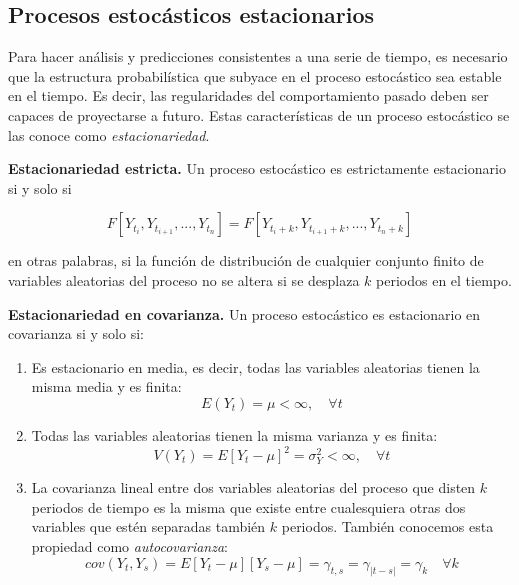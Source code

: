 \documentclass[a4paper,10pt]{article}
\begin{document}
\subsection{Procesos estocásticos estacionarios}

Para hacer análisis y predicciones consistentes a una serie de tiempo, es necesario que la estructura probabilística que subyace en el proceso estocástico sea estable en el tiempo. Es decir, las regularidades del comportamiento pasado deben ser capaces de proyectarse a futuro. Estas características de un proceso estocástico se las conoce como \textit{estacionariedad}.

\textbf{Estacionariedad estricta.} Un proceso estocástico es estrictamente estacionario si y solo si

\begin{equation}
F[Y_{t_i}, Y_{t_{i+1}},...,Y_{t_n}] = F[Y_{t_i+k}, Y_{t_{i+1}+k},...,Y_{t_n+k}]
\end{equation}

en otras palabras, si la función de distribución de cualquier conjunto finito de variables aleatorias del proceso no se altera si se desplaza $k$ periodos en el tiempo.

\textbf{Estacionariedad en covarianza.} Un proceso estocástico es estacionario en covarianza si y solo si:

\begin{enumerate}
 \item Es estacionario en media, es decir, todas las variables aleatorias tienen la misma media y es finita:
 \begin{equation}
  E(Y_t) = \mu < \infty, \quad \forall t
 \end{equation}

 \item Todas las variables aleatorias tienen la misma varianza y es finita:
 \begin{equation}\label{eqn:varianza}
  V(Y_t) = E[Y_t - \mu]^2 = \sigma_Y^2 < \infty, \quad \forall t
 \end{equation}

 \item La covarianza lineal entre dos variables aleatorias del proceso que disten $k$ periodos de tiempo es la misma que existe entre cualesquiera otras dos variables que estén separadas también $k$ periodos. También conocemos esta propiedad como \textit{autocovarianza}:
 \begin{equation}\label{eqn:covarianza}
  cov(Y_t,Y_s) = E[Y_t - \mu][Y_s - \mu] = \gamma_{t,s} = \gamma_{|t-s|} = \gamma_k \quad \forall k
 \end{equation}

\end{enumerate}
\end{document}
